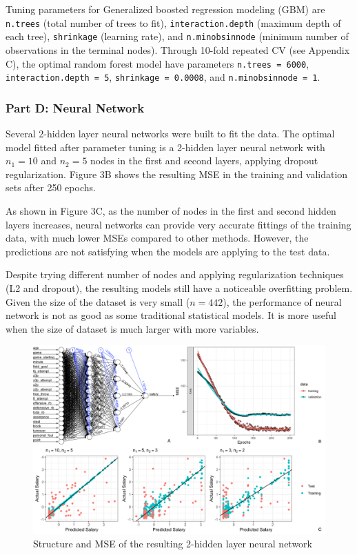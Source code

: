 \documentclass[
]{article}
\begin{document}
Tuning parameters for Generalized boosted regression modeling (GBM) are
\texttt{n.trees} (total number of trees to fit),
\texttt{interaction.depth} (maximum depth of each tree),
\texttt{shrinkage} (learning rate), and \texttt{n.minobsinnode} (minimum
number of observations in the terminal nodes). Through 10-fold repeated
CV (see Appendix C), the optimal random forest model have parameters
\texttt{n.trees\ =\ 6000}, \texttt{interaction.depth\ =\ 5},
\texttt{shrinkage\ =\ 0.0008}, and \texttt{n.minobsinnode\ =\ 1}.

\hypertarget{part-d-neural-network}{%
\subsubsection{Part D: Neural Network}\label{part-d-neural-network}}

Several 2-hidden layer neural networks were built to fit the data. The
optimal model fitted after parameter tuning is a 2-hidden layer neural
network with \(n_1 = 10\) and \(n_2 = 5\) nodes in the first and second
layers, applying dropout regularization. Figure 3B shows the resulting
MSE in the training and validation sets after 250 epochs.

As shown in Figure 3C, as the number of nodes in the first and second
hidden layers increases, neural networks can provide very accurate
fittings of the training data, with much lower MSEs compared to other
methods. However, the predictions are not satisfying when the models are
applying to the test data.

Despite trying different number of nodes and applying regularization
techniques (L2 and dropout), the resulting models still have a
noticeable overfitting problem. Given the size of the dataset is very
small (\(n=442\)), the performance of neural network is not as good as
some traditional statistical models. It is more useful when the size of
dataset is much larger with more variables.

\begin{figure}
\centering
\includegraphics{report_figures/figure_nn.png}
\caption{Structure and MSE of the resulting 2-hidden layer neural
network}
\end{figure}
\end{document}
